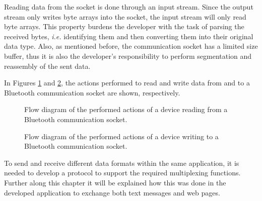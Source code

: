 Reading data from the socket is done through an input stream. Since the output stream only writes byte arrays into the socket, the input stream will only read byte arrays. This property burdens the developer with the task of parsing the received bytes, \textit{i.e.} identifying them and then converting them into their original data type. Also, as mentioned before, the communication socket has a limited size buffer, thus it is also the developer's responsibility to perform segmentation and reassembly of the sent data.

In Figures \ref{fig:btconnectedr} and \ref{fig:btconnectedw}, the actions performed to read and write data from and to a Bluetooth communication socket are shown, respectively.

\begin{figure}[ht]
	\noindent{}
	\caption{\label{fig:btconnectedr} Flow diagram of the performed actions of a device reading from a Bluetooth communication socket.}
\end{figure}

\begin{figure}[ht]
	\noindent{}
	\caption{\label{fig:btconnectedw} Flow diagram of the performed actions of a device writing to a Bluetooth communication socket.}
\end{figure}

To send and receive different data formats within the same application, it is needed to develop a protocol to support the required multiplexing functions. Further along this chapter it will be explained how this was done in the developed application to exchange both text messages and web pages.

